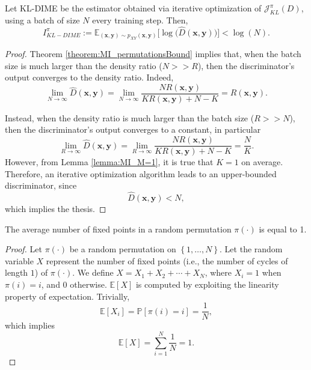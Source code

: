 \begin{corollary}
Let KL-DIME be the estimator obtained via iterative optimization of $\mathcal{J}_{KL}^{\pi}(D)$, using a batch of size $N$ every training step. Then,
\begin{equation}
    I_{KL-DIME}^{\pi} := \mathbb{E}_{(\mathbf{x},\mathbf{y}) \sim p_{XY}(\mathbf{x},\mathbf{y})}\biggl[ \log \biggl(\hat{D}(\mathbf{x},\mathbf{y})\biggr) \biggr] < \log(N).
\end{equation}
\end{corollary}

\begin{proof}
Theorem \ref{theorem:MI_permutationsBound} implies that, when the batch size is much larger than the density ratio ($N >> R$), then the discriminator's output converges to the density ratio. Indeed,
\begin{equation}
    \lim_{N\to \infty}{\hat{D}(\mathbf{x},\mathbf{y})} = \lim_{N\to \infty}{\frac{NR(\mathbf{x},\mathbf{y})}{KR(\mathbf{x},\mathbf{y})+N-K}} = R(\mathbf{x},\mathbf{y}).
\end{equation}

Instead, when the density ratio is much larger than the batch size ($R>>N$), then the discriminator's output converges to a constant, in particular 
\begin{equation}
    \lim_{R\to \infty}{\hat{D}(\mathbf{x},\mathbf{y})} = \lim_{R\to \infty}{\frac{NR(\mathbf{x},\mathbf{y})}{KR(\mathbf{x},\mathbf{y})+N-K}} = \frac{N}{K}.
\end{equation}
However, from Lemma \ref{lemma:MI_M=1}, it is true that $K=1$ on average. Therefore, an iterative optimization algorithm leads to an upper-bounded discriminator, since
\begin{equation}
    \hat{D}(\mathbf{x},\mathbf{y}) < N,
\end{equation}
which implies the thesis.
\end{proof}

\begin{lemma}[Related to Lemma~\ref{lemma:MI_M=1}]
The average number of fixed points in a random permutation $\pi(\cdot)$ is equal to 1.
\end{lemma}
\begin{proof}
Let $\pi(\cdot)$ be a random permutation on $\left\{ 1, \dotsc, N \right\}$. Let the random variable $X$ represent the number of fixed points (i.e., the number of cycles of length $1$) of $\pi(\cdot)$. We define $X = X_1 + X_2 + \cdots + X_N$, where $X_i = 1$ when $\pi(i)=i$, and $0$ otherwise. $\mathbb{E}[X]$ is computed by exploiting the linearity property of expectation. Trivially,
\begin{equation}
    \mathbb{E}[X_i] = \mathbb{P}[\pi(i)=i] = \frac{1}{N},
\end{equation}
which implies 
\begin{equation}
    \mathbb{E}[X] = \sum_{i=1}^N \frac{1}{N} = 1.
\end{equation}
\end{proof}


